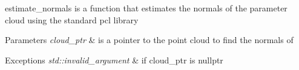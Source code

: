 estimate\+\_\+normals is a function that estimates the normals of the parameter cloud using the standard pcl library 


\begin{DoxyParams}{Parameters}
{\em cloud\+\_\+ptr} & is a pointer to the point cloud to find the normals of \\
\hline
\end{DoxyParams}

\begin{DoxyExceptions}{Exceptions}
{\em std\+::invalid\+\_\+argument} & if cloud\+\_\+ptr is nullptr \\
\hline
\end{DoxyExceptions}
